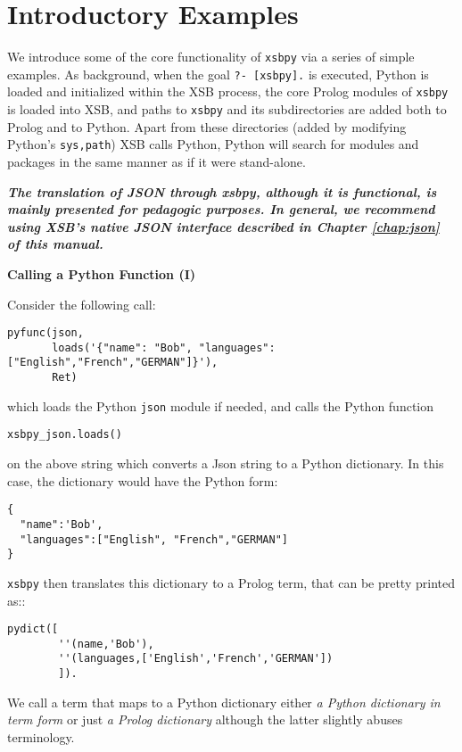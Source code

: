 \section{Introductory Examples}

We introduce some of the core functionality of {\tt xsbpy} via a
series of simple examples.  As background, when the goal {\tt ?-
  [xsbpy].} is executed, Python is loaded and initialized within the
XSB process, the core Prolog modules of {\tt xsbpy} is loaded into
XSB, and paths to {\tt xsbpy} and its subdirectories are added both to
Prolog and to Python.  Apart from these directories (added by
modifying Python's {\tt sys,path}) XSB calls Python, Python will
search for modules and packages in the same manner as if it were
stand-alone.

{\bf {\em The translation of JSON through xsbpy, although it is
    functional, is mainly presented for pedagogic purposes.  In
    general, we recommend using XSB's native JSON interface described
    in Chapter \ref{chap:json} of this manual.    }}

\begin{example} \rm {\bf Calling a Python Function (I)}
  
\noindent  
Consider the following call:

 \begin{verbatim}
pyfunc(json,
       loads('{"name": "Bob", "languages": ["English","French","GERMAN"]}'),
       Ret)
\end{verbatim}
 
\noindent 
which loads the Python {\tt json} module if needed, and calls the
Python function

{\tt xsbpy\_json.loads()}

\noindent
on the above string which converts a Json string to a Python
dictionary.  In this case, the dictionary would have the Python form:
\begin{verbatim}
{
  "name":'Bob',
  "languages":["English", "French","GERMAN"]
}
\end{verbatim}
{\tt xsbpy} then translates this dictionary to a Prolog term, that can
be pretty printed as::
\begin{verbatim}
pydict([
        ''(name,'Bob'),
        ''(languages,['English','French','GERMAN'])
        ]).
\end{verbatim}
We call a term that maps to a Python dictionary either {\em a Python
  dictionary in term form} or just {\em a Prolog dictionary} although
the latter slightly abuses terminology.
\end{example}

